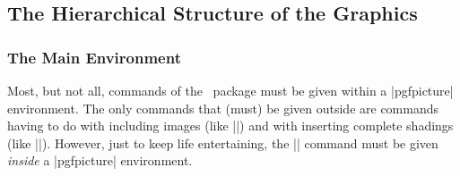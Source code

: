\subsection{The Hierarchical Structure of the Graphics}

\subsubsection{The Main Environment}


Most, but not all, commands of the \pgfname\ package must be given
within a |{pgfpicture}| environment. The only commands that (must) be
given outside are commands having to do with including images (like
|\pgfuseimage|) and with inserting complete shadings (like
|\pgfuseshading|). However, just to keep life entertaining, the
|\pgfshadepath| command must be given \emph{inside} a |{pgfpicture}|
environment.

